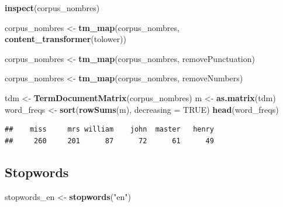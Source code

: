 \documentclass[
]{article}
\newenvironment{Shaded}{\begin{snugshade}}{\end{snugshade}}
\newcommand{\AttributeTok}[1]{\textcolor[rgb]{0.13,0.29,0.53}{#1}}
\newcommand{\ConstantTok}[1]{\textcolor[rgb]{0.56,0.35,0.01}{#1}}
\newcommand{\FunctionTok}[1]{\textcolor[rgb]{0.13,0.29,0.53}{\textbf{#1}}}
\newcommand{\NormalTok}[1]{#1}
\newcommand{\OtherTok}[1]{\textcolor[rgb]{0.56,0.35,0.01}{#1}}
\newcommand{\StringTok}[1]{\textcolor[rgb]{0.31,0.60,0.02}{#1}}
\begin{document}
\begin{Shaded}
\begin{Highlighting}[]
\FunctionTok{inspect}\NormalTok{(corpus\_nombres)}
\end{Highlighting}
\end{Shaded}

\begin{Shaded}
\begin{Highlighting}[]
\NormalTok{corpus\_nombres }\OtherTok{\textless{}{-}} \FunctionTok{tm\_map}\NormalTok{(corpus\_nombres, }\FunctionTok{content\_transformer}\NormalTok{(tolower))}

\NormalTok{corpus\_nombres }\OtherTok{\textless{}{-}} \FunctionTok{tm\_map}\NormalTok{(corpus\_nombres, removePunctuation)}

\NormalTok{corpus\_nombres }\OtherTok{\textless{}{-}} \FunctionTok{tm\_map}\NormalTok{(corpus\_nombres, removeNumbers)}

\NormalTok{tdm }\OtherTok{\textless{}{-}} \FunctionTok{TermDocumentMatrix}\NormalTok{(corpus\_nombres)}
\NormalTok{m }\OtherTok{\textless{}{-}} \FunctionTok{as.matrix}\NormalTok{(tdm)}
\NormalTok{word\_freqs }\OtherTok{\textless{}{-}} \FunctionTok{sort}\NormalTok{(}\FunctionTok{rowSums}\NormalTok{(m), }\AttributeTok{decreasing =} \ConstantTok{TRUE}\NormalTok{)}
\FunctionTok{head}\NormalTok{(word\_freqs)}
\end{Highlighting}
\end{Shaded}

\begin{verbatim}
##    miss     mrs william    john  master   henry 
##     260     201      87      72      61      49
\end{verbatim}

\hypertarget{stopwords}{%
\subsection{Stopwords}\label{stopwords}}

\begin{Shaded}
\begin{Highlighting}[]
\NormalTok{stopwords\_en }\OtherTok{\textless{}{-}} \FunctionTok{stopwords}\NormalTok{(}\StringTok{"en"}\NormalTok{)}
\end{Highlighting}
\end{Shaded}
\end{document}
